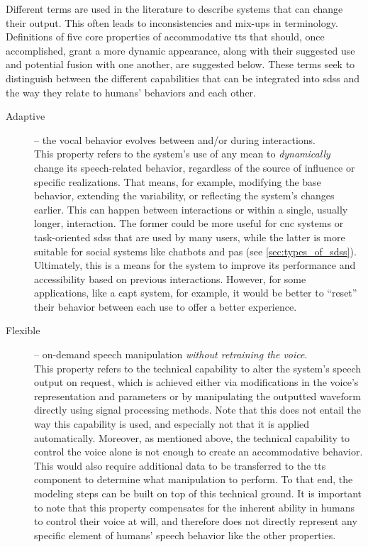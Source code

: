Different terms are used in the literature to describe systems that can change their output.
This often leads to inconsistencies and mix-ups in terminology.
Definitions of five core properties of accommodative \ac{tts} that should, once accomplished, grant a more dynamic appearance, along with their suggested use and potential fusion with one another, are suggested below.
These terms seek to distinguish between the different capabilities that can be integrated into \acp{sds} and the way they relate to humans’ behaviors and each other.
%
\begin{description}
	\item[Adaptive] -- the vocal behavior evolves between and/or during interactions.\\
	This property refers to the system's use of any mean to \emph{dynamically} change its speech-related behavior, regardless of the source of influence or specific realizations.
	That means, for example, modifying the base behavior, extending the variability, or reflecting the system's changes earlier.
	This can happen between interactions or within a single, usually longer, interaction.
	The former could be more useful for \ac{cnc} systems or task-oriented \acp{sds} that are used by many users, while the latter is more suitable for social systems like chatbots and \acp{pa} (see \cref{sec:types_of_sdss}).
	Ultimately, this is a means for the system to improve its performance and accessibility based on previous interactions.
	However, for some applications, like a \ac{capt} system, for example, it would be better to \enquote{reset} their behavior between each use to offer a better experience.

	\item[Flexible] -- on-demand speech manipulation \emph{without retraining the voice}.\\
	This property refers to the technical capability to alter the system's speech output on request, which is achieved either via modifications in the voice's representation and parameters or by manipulating the outputted waveform directly using signal processing methods.
	Note that this does not entail the way this capability is used, and especially not that it is applied automatically.
	Moreover, as mentioned above, the technical capability to control the voice alone is not enough to create an accommodative behavior.
	This would also require additional data to be transferred to the \ac{tts} component to determine what manipulation to perform.
	To that end, the modeling steps can be built on top of this technical ground.
	It is important to note that this property compensates for the inherent ability in humans to control their voice at will, and therefore does not directly represent any specific element of humans' speech behavior like the other properties.
	

\end{description}
